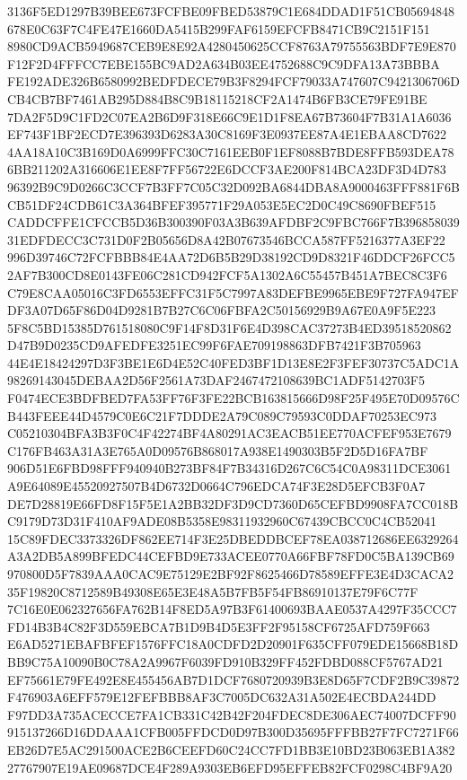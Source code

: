 \documentclass[UTF8,fontset=fandol,zihao=-4,a4paper]{ctexart}
\begin{document}
{{3136F5ED1297B39BEE673FCFBE09FBED53879C1E684DDAD1F51CB05694848678E0C63F7C4FE47E1660DA5415B299FAF6159EFCFB8471CB9C2151F151
8980CD9ACB5949687CEB9E8E92A4280450625CCF8763A79755563BDF7E9E870F12F2D4FFFCC7EBE155BC9AD2A634B03EE4752688C9C9DFA13A73BBBA
FE192ADE326B6580992BEDFDECE79B3F8294FCF79033A747607C9421306706DCB4CB7BF7461AB295D884B8C9B18115218CF2A1474B6FB3CE79FE91BE
7DA2F5D9C1FD2C07EA2B6D9F318E66C9E1D1F8EA67B73604F7B31A1A6036EF743F1BF2ECD7E396393D6283A30C8169F3E0937EE87A4E1EBAA8CD7622
4AA18A10C3B169D0A6999FFC30C7161EEB0F1EF8088B7BDE8FFB593DEA786BB211202A316606E1EE8F7FF56722E6DCCF3AE200F814BCA23DF3D4D783
96392B9C9D0266C3CCF7B3FF7C05C32D092BA6844DBA8A9000463FFF881F6BCB51DF24CDB61C3A364BFEF395771F29A053E5EC2D0C49C8690FBEF515
CADDCFFE1CFCCB5D36B300390F03A3B639AFDBF2C9FBC766F7B39685803931EDFDECC3C731D0F2B05656D8A42B07673546BCCA587FF5216377A3EF22
996D39746C72FCFBBB84E4AA72D6B5B29D38192CD9D8321F46DDCF26FCC52AF7B300CD8E0143FE06C281CD942FCF5A1302A6C55457B451A7BEC8C3F6
C79E8CAA05016C3FD6553EFFC31F5C7997A83DEFBE9965EBE9F727FA947EFDF3A07D65F86D04D9281B7B27C6C06FBFA2C50156929B9A67E0A9F5E223
5F8C5BD15385D761518080C9F14F8D31F6E4D398CAC37273B4ED39518520862D47B9D0235CD9AFEDFE3251EC99F6FAE709198863DFB7421F3B705963
44E4E18424297D3F3BE1E6D4E52C40FED3BF1D13E8E2F3FEF30737C5ADC1A98269143045DEBAA2D56F2561A73DAF2467472108639BC1ADF5142703F5
F0474ECE3BDFBED7FA53FF76F3FE22BCB163815666D98F25F495E70D09576CB443FEEE44D4579C0E6C21F7DDDE2A79C089C79593C0DDAF70253EC973
C05210304BFA3B3F0C4F42274BF4A80291AC3EACB51EE770ACFEF953E7679C176FB463A31A3E765A0D09576B868017A938E1490303B5F2D5D16FA7BF
906D51E6FBD98FFF940940B273BF84F7B34316D267C6C54C0A98311DCE3061A9E64089E45520927507B4D6732D0664C796EDCA74F3E28D5EFCB3F0A7
DE7D28819E66FD8F15F5E1A2BB32DF3D9CD7360D65CEFBD9908FA7CC018BC9179D73D31F410AF9ADE08B5358E98311932960C67439CBCC0C4CB52041
15C89FDEC3373326DF862EE714F3E25DBEDDBCEF78EA038712686EE6329264A3A2DB5A899BFEDC44CEFBD9E733ACEE0770A66FBF78FD0C5BA139CB69
970800D5F7839AAA0CAC9E75129E2BF92F8625466D78589EFFE3E4D3CACA235F19820C8712589B49308E65E3E48A5B7FB5F54FB86910137E79F6C77F
7C16E0E062327656FA762B14F8ED5A97B3F61400693BAAE0537A4297F35CCC7FD14B3B4C82F3D559EBCA7B1D9B4D5E3FF2F95158CF6725AFD759F663
E6AD5271EBAFBFEF1576FFC18A0CDFD2D20901F635CFF079EDE15668B18DBB9C75A10090B0C78A2A9967F6039FD910B329FF452FDBD088CF5767AD21
EF75661E79FE492E8E455456AB7D1DCF7680720939B3E8D65F7CDF2B9C39872F476903A6EFF579E12FEFBBB8AF3C7005DC632A31A502E4ECBDA244DD
F97DD3A735ACECCE7FA1CB331C42B42F204FDEC8DE306AEC74007DCFF90915137266D16DDAAA1CFB005FFDCD0D97B300D35695FFFBB27F7FC7271F66
EB26D7E5AC291500ACE2B6CEEFD60C24CC7FD1BB3E10BD23B063EB1A38227767907E19AE09687DCE4F289A9303EB6EFD95EFFEB82FCF0298C4BF9A20
}}
\end{document}
